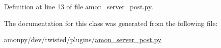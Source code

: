 Definition at line 13 of file amon\-\_\-server\-\_\-post.\-py.



The documentation for this class was generated from the following file\-:\begin{DoxyCompactItemize}
\item 
amonpy/dev/twisted/plugins/\hyperlink{dev_2twisted_2plugins_2amon__server__post_8py}{amon\-\_\-server\-\_\-post.\-py}\end{DoxyCompactItemize}
